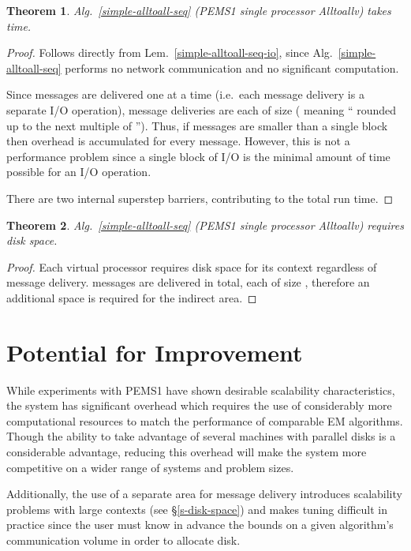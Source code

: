 \documentclass[12pt]{carletoncsthesis}
\newtheorem{thm}{Theorem}[section]
\begin{document}
\begin{thm}
\label{simple-alltoall-seq-time}
Alg.~\ref{simple-alltoall-seq} (PEMS1 single processor {\sc Alltoallv})
takes  time.
\end{thm}
\begin{proof}
Follows directly from Lem.~\ref{simple-alltoall-seq-io}, since
Alg.~\ref{simple-alltoall-seq} performs no network communication and no
significant computation.

Since messages are delivered one at a time (i.e.\ each message
delivery is a separate I/O operation), message deliveries are each of
size  ( meaning
`` rounded up to the next multiple of '').  Thus, if messages are
smaller than a single block then overhead is accumulated for every message.
However, this is not a performance problem since a single block of I/O is
the minimal amount of time possible for an I/O operation.

There are two internal superstep barriers, contributing  to the total
run time.
\end{proof}

\begin{thm}
\label{simple-alltoall-seq-mem}
Alg.~\ref{simple-alltoall-seq} (PEMS1 single processor {\sc Alltoallv})
requires  disk space.
\end{thm}
\begin{proof}
Each virtual processor requires  disk space for its context regardless
of message delivery.   messages are delivered in total, each of size
, therefore an additional  space is required for the
indirect area.
\end{proof}

\section{Potential for Improvement}
\label{potential}


While experiments with PEMS1 have shown desirable scalability characteristics,
the system has significant overhead which requires the use of considerably more
computational resources to match the performance of comparable EM algorithms.
Though the ability to take advantage of several machines with parallel disks
is a considerable advantage, reducing this overhead will make the system
more competitive on a wider range of systems and problem sizes.

Additionally, the use of a separate area for message delivery introduces
scalability problems with large contexts (see \S\ref{s-disk-space})
and makes tuning difficult in practice since the user must know in advance
the bounds on a given algorithm's communication volume in order to allocate
disk.
\end{document}
